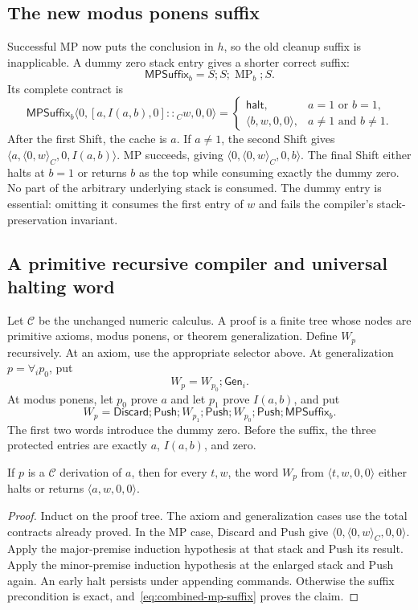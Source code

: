 \subsection{The new modus ponens suffix}

Successful MP now puts the conclusion in $h$, so the old cleanup suffix is
inapplicable.  A dummy zero stack entry gives a shorter correct suffix:
\[
 \mathsf{MPSuffix}_b=S;S;\operatorname{MP}_b;S.
\]
Its complete contract is
\begin{equation}\label{eq:combined-mp-suffix}
 \mathsf{MPSuffix}_b
 \langle0,[a,I(a,b),0]\mathbin{::}_C w,0,0\rangle
 =\begin{cases}
    \mathsf{halt},&a=1\text{ or }b=1,\\
    \langle b,w,0,0\rangle,&a\ne1\text{ and }b\ne1.
  \end{cases}
\end{equation}
After the first Shift, the cache is $a$.  If $a\ne1$, the second Shift
gives $\langle a,\langle0,w\rangle_C,0,I(a,b)\rangle$.  MP succeeds,
giving $\langle0,\langle0,w\rangle_C,0,b\rangle$.  The final Shift
either halts at $b=1$ or returns $b$ as the top while consuming exactly the
dummy zero.  No part of the arbitrary underlying stack is consumed.
The dummy entry is essential: omitting it consumes the first entry of $w$
and fails the compiler's stack-preservation invariant.

\subsection{A primitive recursive compiler and universal halting word}

Let $\mathcal C$ be the unchanged numeric calculus.  A proof is a finite tree
whose nodes are primitive axioms, modus ponens, or theorem generalization.
Define $W_p$ recursively.  At an axiom, use the appropriate selector above.
At generalization $p=\forall_i p_0$, put
\[
 W_p=W_{p_0};\mathsf{Gen}_i.
\]
At modus ponens, let $p_0$ prove $a$ and let $p_1$ prove $I(a,b)$, and put
\[
 W_p=\mathsf{Discard};\mathsf{Push};
     W_{p_1};\mathsf{Push};W_{p_0};\mathsf{Push};\mathsf{MPSuffix}_b.
\]
The first two words introduce the dummy zero.  Before the suffix, the three
protected entries are exactly $a$, $I(a,b)$, and zero.

\begin{lemma}
If $p$ is a $\mathcal C$ derivation of $a$, then for every $t,w$,
the word $W_p$ from $\langle t,w,0,0\rangle$ either halts or returns
$\langle a,w,0,0\rangle$.
\end{lemma}
\begin{proof}
Induct on the proof tree.  The axiom and generalization cases use the total
contracts already proved.  In the MP case, Discard and Push give
$\langle0,\langle0,w\rangle_C,0,0\rangle$.  Apply the major-premise
induction hypothesis at that stack and Push its result.  Apply the
minor-premise induction hypothesis at the enlarged stack and Push again.
An early halt persists under appending commands.  Otherwise the suffix
precondition is exact, and~\eqref{eq:combined-mp-suffix} proves the claim.
\end{proof}

